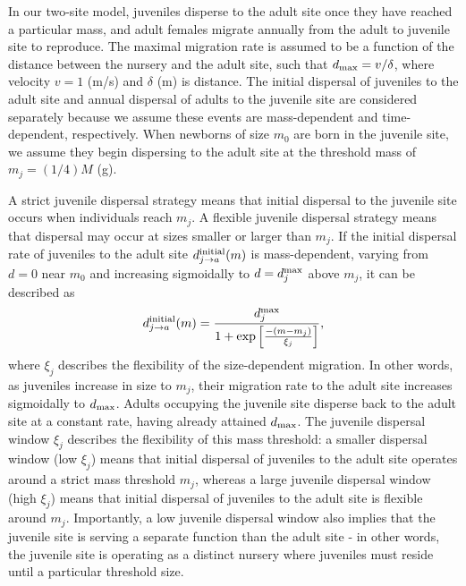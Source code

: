 \documentclass[]{rsos}%
\begin{document}
In our two-site model, juveniles disperse to the adult site once they have reached a particular mass, and adult females migrate annually from the adult to juvenile site to reproduce.
The maximal migration rate is assumed to be a function of the distance between the nursery and the adult site, such that $d_{\rm max} = v/\delta$, where velocity $v=1$ (m/s) and $\delta$ (m) is distance. 
The initial dispersal of juveniles to the adult site and annual dispersal of adults to the juvenile site are considered separately because we assume these events are mass-dependent and time-dependent, respectively.
When newborns of size $m_0$ are born in the juvenile site, we assume they begin dispersing to the adult site at the threshold mass of $m_j = (1/4)M$ (g).

A strict juvenile dispersal strategy means that initial dispersal to the juvenile site occurs when individuals reach $m_j$.
A flexible juvenile dispersal strategy means that dispersal may occur at sizes smaller or larger than $m_j$.
If the initial dispersal rate of juveniles to the adult site $d_{j\rightarrow a}^{\rm initial}(m)$ is mass-dependent, varying from $d=0$ near $m_0$ and increasing sigmoidally to $d=d_j^{\rm max}$ above $m_j$, it can be described as
\begin{equation}
    d_{j\rightarrow a}^{\rm initial}(m) = \frac{d_j^{\rm max}}{1 + {\rm exp}\left[\frac{-(m - m_j)}{\xi_j}\right]},
\end{equation}
where $\xi_j$ describes the flexibility of the size-dependent migration.
In other words, as juveniles increase in size to $m_j$, their migration rate to the adult site increases sigmoidally to $d_{\rm max}$.
Adults occupying the juvenile site disperse back to the adult site at a constant rate, having already attained $d_{\rm max}$.
The juvenile dispersal window $\xi_j$ describes the flexibility of this mass threshold: a smaller dispersal window (low $\xi_j$) means that initial dispersal of juveniles to the adult site operates around a strict mass threshold $m_j$, whereas a large juvenile dispersal window (high $\xi_j$) means that initial dispersal of juveniles to the adult site is flexible around $m_j$.
Importantly, a low juvenile dispersal window also implies that the juvenile site is serving a separate function than the adult site - in other words, the juvenile site is operating as a distinct nursery where juveniles must reside until a particular threshold size.
\end{document}
